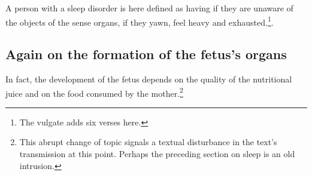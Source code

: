 \begin{translation}
\item[49]

\begin{sloka}
    A person with a sleep disorder is here defined as having
 if they are unaware of the objects of the sense
organs, if they yawn, feel heavy and exhausted.\footnote{The vulgate adds 
    six verses here.}.
\end{sloka}

%
%
%
%
%
%
%
%
%
%
%


\subsection{Again on the formation of the fetus's organs}

\item[57]

In fact, the development of the fetus depends on the quality of the
nutritional juice and on the food consumed by the
mother.\footnote{This abrupt change of topic signals a textual disturbance in
    the text's transmission at this point.  Perhaps the preceding section on sleep 
    is an old intrusion.}


\end{translation}
